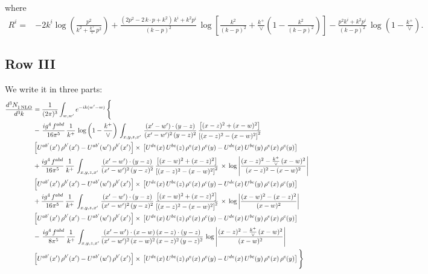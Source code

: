 \documentclass[9pt]{article}
\numberwithin{equation}{section}
\begin{document}
where
\begin{align}
R^{i} =& -2k^{i}\log\left(\frac{p^{2}}{k^{2}+\frac{k^{+}}{\vee}\,p^{2}}\right)
+\frac{(2p^{2}-2\,k\cdot p+k^{2})\,k^{i}+k^{2}p^{i}}{(k-p)^{2}}\,
\log\left[\frac{k^{2}}{(k-p)^{2}}+\frac{k^{+}}{\vee}\left(1-\frac{k^{2}}{(k-p)^{2}}\right)\right]
-\frac{p^{2}k^{i}+k^{2}p^{i}}{(k-p)^{2}}\,\log\left(1-\frac{k^{+}}{\vee}\right).
\end{align}
\subsection{Row III}
We write it in three parts:
\begin{align}
   \frac{d^{3}N_{1\,\rm NLO}^{\rm}}{d^{3}k}  & =  \frac{1}{(2\pi)^{3}}  \int_{w, w^\prime} e^{-ik(w^\prime-w)}\, \Bigg\{\notag \\
& -\,\frac{ig^{4}\,f^{abd}}{16\pi^{5}}\,\frac{1}{k^{+}}\,\log{\left(1-\frac{k^{+}}{\vee}\right)}\,\int_{x,y,z,x'}\, \frac{(x'-w')\cdot (y-z)}{(x'-w')^{2}\,(y-z)^{2}}\,\frac{\left[(x-z)^{2}+(x-w)^{2}\right]}{\left[(x-z)^{2}-(x-w)^{2}\right]^{2}}\notag \\ & \left[U^{ab'}(x')\,\rho^{b'}(x')-U^{ab'}(w')\, \rho^{b'}(x')\right]\times\, \left[U^{de}(x)\,U^{bc}(z)\, \rho^{e}(x)\,\rho^{c}(y)-U^{de}(x)\,U^{bc}(y)\,\rho^{e}(x)\,\rho^{c}(y)\right] \notag \\
&  +\frac{ig^{4}\,f^{abd}}{16\pi^{5}}\, \frac{1}{k^{+}}\,\int_{x,y,z,x'}\, \frac{(x'-w')\cdot (y-z)}{(x'-w')^{2}\,(y-z)^{2}}\, \frac{\left[(x-w)^{2}+(x-z)^{2}\right]}{\left[(x-z)^{2}-(x-w)^{2}\right]^{2}}\, \times\, \log{\left|\frac{(x-z)^{2}-\frac{k^{+}}{\vee}\,(x-w)^{2}}{(x-z)^{2}-(x-w)^{2}}\right|}\notag \\ & \left[U^{ab'}(x')\,\rho^{b'}(x')-U^{ab'}(w')\, \rho^{b'}(x')\right]\times\, \left[U^{de}(x)\,U^{bc}(z)\, \rho^{e}(x)\,\rho^{c}(y)-U^{de}(x)\,U^{bc}(y)\,\rho^{e}(x)\,\rho^{c}(y)\right] \notag \\
&  +\frac{ig^{4}\,f^{abd}}{16\pi^{5}}\, \frac{1}{k^{+}}\,\int_{x,y,z,x'}\, \frac{(x'-w')\cdot (y-z)}{(x'-w')^{2}\,(y-z)^{2}}\, \frac{\left[(x-w)^{2}+(x-z)^{2}\right]}{\left[(x-z)^{2}-(x-w)^{2}\right]^{2}}\, \times\, \log{\left|\frac{(x-w)^{2}-(x-z)^{2}}{(x-w)^{2}}\right|}\notag \\ & \left[U^{ab'}(x')\,\rho^{b'}(x')-U^{ab'}(w')\, \rho^{b'}(x')\right]\times\, \left[U^{de}(x)\,U^{bc}(z)\, \rho^{e}(x)\,\rho^{c}(y)-U^{de}(x)\,U^{bc}(y)\,\rho^{e}(x)\,\rho^{c}(y)\right] \notag \\
&-\, \frac{ig^{4}\,f^{abd}}{8\pi^{5}}\,\frac{1}{k^{+}}\,\int_{x,y,z,x'}\frac{(x'-w')\cdot (x-w)\, (x-z)\cdot (y-z)}{(x'-w')^{2}\, (x-w)^{2}\, (x-z)^{2}\, (y-z)^{2}}\,\log{\left|\frac{(x-z)^{2}-\frac{k^{+}}{\vee}\,(x-w)^{2}}{(x-w)^{2}}\right|} \notag \\ & \left[U^{ab'}(x')\,\rho^{b'}(x')-U^{ab'}(w')\, \rho^{b'}(x')\right]\times\, \left[U^{de}(x)\,U^{bc}(z)\, \rho^{e}(x)\,\rho^{c}(y)-U^{de}(x)\,U^{bc}(y)\,\rho^{e}(x)\,\rho^{c}(y)\right]\Bigg\}
\end{align}
\end{document}
